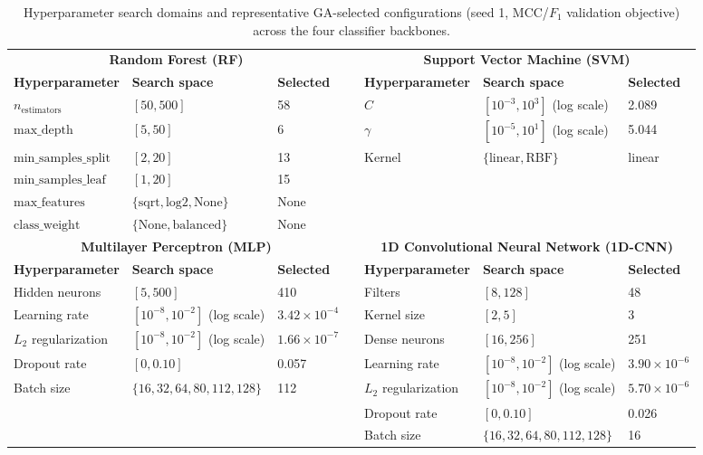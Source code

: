 \begin{table}
\centering
\caption{Hyperparameter search domains and representative GA-selected configurations (seed 1, MCC/$F_1$ validation objective) across the four classifier backbones.}
\label{tab:all_hyperparameters}
\small
\begin{tabular}{lllclll}\toprule
\multicolumn{3}{c}{\textbf{Random Forest (RF)}} & & \multicolumn{3}{c}{\textbf{Support Vector Machine (SVM)}} \\\cmidrule{1-3}\cmidrule{5-7}
\textbf{Hyperparameter} & \textbf{Search space} & \textbf{Selected} & & \textbf{Hyperparameter} & \textbf{Search space} & \textbf{Selected}\\\midrule
$n_{\mathrm{estimators}}$ & $[50,500]$ & 58 & & $C$ & $[10^{-3},10^{3}]$ (log scale) & 2.089\\
$\mathrm{max\_depth}$ & $[5,50]$ & 6 & & $\gamma$ & $[10^{-5},10^{1}]$ (log scale) & 5.044\\
$\mathrm{min\_samples\_split}$ & $[2,20]$ & 13 & & Kernel & $\{\mathrm{linear},\mathrm{RBF}\}$ & linear\\
$\mathrm{min\_samples\_leaf}$ & $[1,20]$ & 15 & & & & \\
$\mathrm{max\_features}$ & $\{\mathrm{sqrt},\mathrm{log2},\mathrm{None}\}$ & None & & & & \\
$\mathrm{class\_weight}$ & $\{\mathrm{None},\mathrm{balanced}\}$ & None & & & & \\\midrule
\multicolumn{3}{c}{\textbf{Multilayer Perceptron (MLP)}} & & \multicolumn{3}{c}{\textbf{1D Convolutional Neural Network (1D-CNN)}} \\\cmidrule{1-3}\cmidrule{5-7}
\textbf{Hyperparameter} & \textbf{Search space} & \textbf{Selected} & & \textbf{Hyperparameter} & \textbf{Search space} & \textbf{Selected}\\\midrule
Hidden neurons & $[5,500]$ & 410 & & Filters & $[8,128]$ & 48\\
Learning rate & $[10^{-8},10^{-2}]$ (log scale) & $3.42\times10^{-4}$ & & Kernel size & $[2,5]$ & 3\\
$L_2$ regularization & $[10^{-8},10^{-2}]$ (log scale) & $1.66\times10^{-7}$ & & Dense neurons & $[16,256]$ & 251\\
Dropout rate & $[0,0.10]$ & 0.057 & & Learning rate & $[10^{-8},10^{-2}]$ (log scale) & $3.90\times10^{-6}$\\
Batch size & $\{16,32,64,80,112,128\}$ & 112 & & $L_2$ regularization & $[10^{-8},10^{-2}]$ (log scale) & $5.70\times10^{-6}$\\
& & & & Dropout rate & $[0,0.10]$ & 0.026\\
& & & & Batch size & $\{16,32,64,80,112,128\}$ & 16\\\bottomrule
\end{tabular}
\end{table}
\FloatBarrier

